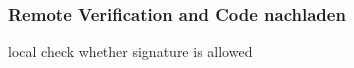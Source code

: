 \subsubsection{Remote Verification and Code nachladen}\label{subsection:external-remote}
local check whether signature is allowed

